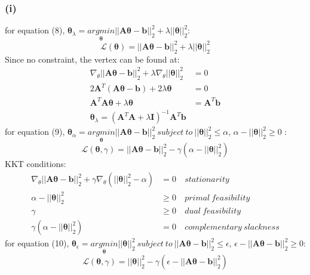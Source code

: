 \documentclass[11pt]{article}
\begin{document}
\subsubsection*{(i)}
for equation (8), $\pmb{\theta}_\lambda=\underset{\pmb{\theta}}{argmin}||\pmb{A\theta}-\pmb{b}||^2_2+\lambda||\pmb{\theta}||^2_2$:\\
\begin{equation}
\mathcal{L}(\pmb{\theta})=||\pmb{A\theta}-\pmb{b}||^2_2+\lambda||\pmb{\theta}||^2_2
\end{equation}
Since no constraint, the vertex can be found at:
\begin{equation}
\begin{split}
\nabla_\theta||\pmb{A\theta}-\pmb{b}||^2_2+\lambda\nabla_\theta||\pmb{\theta}||^2_2&=0\\
2\pmb{A}^T(\pmb{A\theta}-\pmb{b})+2\lambda\pmb{\theta}&=0\\
\pmb{A}^T\pmb{A\theta}+\lambda\pmb{\theta}&=\pmb{A}^T\pmb{b}\\
\pmb{\theta}_\lambda=(\pmb{A}^T\pmb{A}+\lambda\pmb{I})^{-1}\pmb{A}^T\pmb{b}
\end{split}
\end{equation}
for equation (9), $\pmb{\theta}_\alpha=\underset{\pmb{\theta}}{argmin}||\pmb{A\theta}-\pmb{b}||^2_2 \ subject\ to\ ||\pmb{\theta}||^2_2\le\alpha$, $\alpha-||\pmb{\theta}||^2_2\ge 0$ :
\begin{equation}
\mathcal{L}(\pmb{\theta},\gamma)=||\pmb{A\theta}-\pmb{b}||^2_2-\gamma(\alpha-||\pmb{\theta}||^2_2)
\end{equation}
KKT conditions:\\
\begin{equation}
\begin{aligned}
\nabla_\theta||\pmb{A\theta}-\pmb{b}||^2_2+\gamma\nabla_\theta(||\pmb{\theta}||^2_2-\alpha)&=0 &\ stationarity\\
\alpha-||\pmb{\theta}||^2_2&\ge 0 &\ primal\ feasibility\\
\gamma&\ge 0 &\ dual\ feasibility\\
\gamma(\alpha-||\pmb{\theta}||^2_2)&=0 &\ complementary\ slackness
\end{aligned}
\end{equation}
for equation (10),
$\pmb{\theta}_\epsilon=\underset{\pmb{\theta}}{argmin}||\pmb{\theta}||^2_2\ subject\ to\ ||\pmb{A\theta}-\pmb{b}||^2_2\le\epsilon$, $\epsilon-||\pmb{A\theta}-\pmb{b}||^2_2\ge 0$:
\begin{equation}
\mathcal{L}(\pmb{\theta},\gamma)=||\pmb{\theta}||^2_2-\gamma(\epsilon-||\pmb{A\theta}-\pmb{b}||^2_2)
\end{equation}
\end{document}
